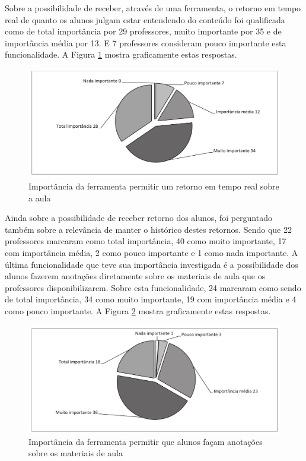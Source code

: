 Sobre a possibilidade de receber, através de uma ferramenta, o retorno em tempo real de quanto os alunos julgam estar entendendo do conteúdo foi qualificada como de total importância por 29 professores, muito importante por 35 e de importância média por 13. E 7 professores consideram pouco importante esta funcionalidade. A Figura \ref{fig:grafico_ferramenta_retorno} mostra graficamente estas respostas.

\begin{figure}[!h]
\centering
\includegraphics[width=1.0\textwidth]{pdfs/professores/img-grafico-ferramenta-retorno.pdf} 
\caption{Importância da ferramenta permitir um retorno em tempo real sobre a aula}
\label{fig:grafico_ferramenta_retorno} 
\end{figure}

Ainda sobre a possibilidade de receber retorno dos alunos, foi perguntado também sobre a relevância de manter o histórico destes retornos. Sendo que 22 professores marcaram como total importância, 40 como muito importante, 17 com importância média, 2 como pouco importante e 1 como nada importante.
A última funcionalidade que teve sua importância investigada é a possibilidade dos alunos fazerem anotações diretamente sobre os materiais de aula que os professores disponibilizarem. Sobre esta funcionalidade, 24 marcaram como sendo de total importância, 34 como muito importante, 19 com importância média e 4 como pouco importante. A Figura \ref{fig:grafico_anotacao} mostra graficamente estas respostas.

\begin{figure}[!h]
\centering
\includegraphics[width=1.0\textwidth]{pdfs/professores/img-grafico-anotacoes.pdf} 
\caption{Importância da ferramenta permitir que alunos façam anotações sobre os materiais de aula}
\label{fig:grafico_anotacao} 
\end{figure}


